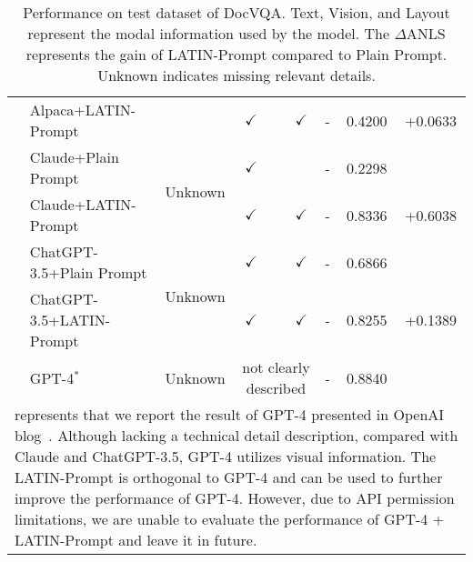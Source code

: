 \documentclass[letterpaper]{article} \usepackage{aaai24_preprint}  \usepackage{times}  \usepackage{helvet}  \usepackage{courier}  \usepackage[hyphens]{url}  \usepackage{graphicx} \urlstyle{rm} \def\UrlFont{\rm}  \usepackage{natbib}  \usepackage{caption} \frenchspacing  \setlength{\pdfpagewidth}{8.5in} \setlength{\pdfpageheight}{11in} \usepackage{algorithm}
\begin{document}
\begin{table*}[t]
\begin{tabular}{@{}clccccccc@{}}
                              & Alpaca+LATIN-Prompt                    &                          & $\checkmark$ &              & $\checkmark$ & -               & 0.4200 & +0.0633      \\ \cmidrule(l){2-9} 
                              & Claude+Plain Prompt                    & \multirow{2}{*}{Unknown} & $\checkmark$ &              &              & -               & 0.2298 &              \\
                              & Claude+LATIN-Prompt                    &                          & $\checkmark$ &              & $\checkmark$ & -               & 0.8336 & +0.6038      \\ \cmidrule(l){2-9} 
                              & ChatGPT-3.5+Plain Prompt                   & \multirow{2}{*}{Unknown} & $\checkmark$ &              & $\checkmark$ & -               & 0.6866 &              \\
                              & ChatGPT-3.5+LATIN-Prompt                   &                          & $\checkmark$ &              & $\checkmark$ & -               & 0.8255 & +0.1389      \\ \cmidrule(l){2-9} 
                              & GPT-4$^*$                              & Unknown                  & \multicolumn{3}{c}{not clearly described}  & -               & 0.8840 &              \\ \bottomrule
\multicolumn{9}{l}{\parbox[c]{16cm}{\small* represents that we report the result of GPT-4 presented in OpenAI blog~\cite{OpenAIGPT4Blog2023}.
Although lacking a technical detail description, compared with Claude and ChatGPT-3.5, GPT-4 utilizes visual information.
The LATIN-Prompt is orthogonal to GPT-4 and can be used to further improve the performance of GPT-4. However, due to API permission limitations, we are unable to evaluate the performance of GPT-4 + LATIN-Prompt and leave it in future.}}
\end{tabular}
\caption{
Performance on test dataset of DocVQA.
Text, Vision, and Layout represent the modal information used by the model.
The $\Delta$ANLS represents the gain of LATIN-Prompt compared to Plain Prompt.
Unknown indicates missing relevant details.
}
\label{tab:exp_docvqa}
\end{table*}
\end{document}
